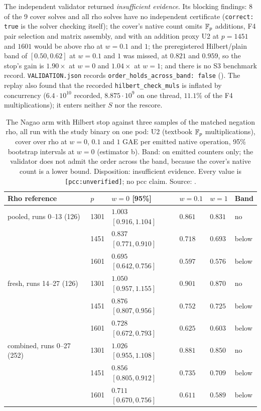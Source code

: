 The independent validator returned \emph{insufficient evidence}. Its
blocking findings: 8 of the 9 cover solves and all rho solves have no
independent certificate (\texttt{correct: true} is the solver checking
itself); the cover's native count omits $\mathbb{F}_p$ additions, F4 pair
selection and matrix assembly, and with an addition proxy U2 at
$p=1451$ and $1601$ would be above rho at $w=0.1$ and $1$; the
preregistered Hilbert/plain band of $[0.50,0.62]$ at $w=0.1$ and $1$ was
missed, at $0.821$ and $0.959$, so the stop's gain is $1.90\times$ at
$w=0$ and $1.04\times$ at $w=1$; and there is no S3 benchmark record.
\texttt{VALIDATION.json} records \texttt{order\_holds\_across\_band: false}
(). The
replay also found that the recorded \texttt{hilbert\_check\_muls} is
inflated by concurrency ($6.4\cdot10^{10}$ recorded, $8.875\cdot10^9$ on one
thread, $11.1\%$ of the F4 multiplications); it enters neither $S$ nor the
rescore.

\begin{table}[t]
\centering\small
\begin{tabular}{@{}llllll@{}}
\toprule
Rho reference & $p$ & $w=0$ [95\%] & $w=0.1$ & $w=1$ & Band \\
\midrule
pooled, runs 0--13 (126) & 1301 & $1.003$ $[0.916,1.104]$ & $0.861$ & $0.831$ & no \\
 & 1451 & $0.837$ $[0.771,0.910]$ & $0.718$ & $0.693$ & below \\
 & 1601 & $0.695$ $[0.642,0.756]$ & $0.597$ & $0.576$ & below \\
\addlinespace
fresh, runs 14--27 (126) & 1301 & $1.050$ $[0.957,1.155]$ & $0.901$ & $0.870$ & no \\
 & 1451 & $0.876$ $[0.807,0.956]$ & $0.752$ & $0.725$ & below \\
 & 1601 & $0.728$ $[0.672,0.793]$ & $0.625$ & $0.603$ & below \\
\addlinespace
combined, runs 0--27 (252) & 1301 & $1.026$ $[0.955,1.108]$ & $0.881$ & $0.850$ & no \\
 & 1451 & $0.856$ $[0.805,0.912]$ & $0.735$ & $0.709$ & below \\
 & 1601 & $0.711$ $[0.670,0.756]$ & $0.611$ & $0.589$ & below \\
\bottomrule
\end{tabular}
\caption[]{The Nagao arm with Hilbert stop against three samples of the
matched negation rho, all run with the study binary on one pod: U2
(textbook $\mathbb{F}_p$ multiplications), cover over rho at $w=0$, $0.1$ and $1$
GAE per emitted native operation, 95\% bootstrap intervals at $w=0$
(estimator b). Band: on emitted counters only; the validator does not
admit the order across the band, because the cover's native count is a
lower bound. Disposition: insufficient evidence. Every value is
\texttt{[pcc:unverified]}; no pcc claim. Source:
.}
\label{tab:ext-jv-hilbert-val}
\end{table}

